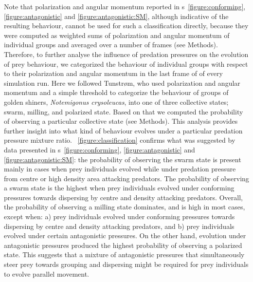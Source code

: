 Note that polarization and angular momentum reported in \figurename s~\ref{figure:conforming}, \ref{figure:antagonistic} and \ref{figure:antagonistic:SM}, although indicative of the resulting behaviour, cannot be used for such a classification directly, because they were computed as weighted sums of polarization and angular momentum of individual groups and averaged over a number of frames (see Methods). Therefore, to further analyse the influence of predation pressures on the evolution of prey behaviour, we categorized the behaviour of individual groups with respect to their polarization and angular momentum in the last frame of of every simulation run. Here we followed Tunstrøm\etal \cite{tunstrom2013collective}, who used polarization and angular momentum and a simple threshold to categorize the behaviour of groups of golden shiners, \emph{Notemigonus crysoleucas}, into one of three collective states; swarm, milling, and polarized state. Based on that we computed the probability of observing a particular collective state (see Methods). This analysis provides further insight into what kind of behaviour evolves under a particular predation pressure mixture ratio. \figurename~\ref{figure:classification} confirms what was suggested by data presented in \figurename s~\ref{figure:conforming}, \ref{figure:antagonistic} and \ref{figure:antagonistic:SM}: the probability of observing the swarm state is present mainly in cases when prey individuals evolved while under predation pressure from centre or high density area attacking predators. The probability of observing a swarm state is the highest when prey individuals evolved under conforming pressures towards dispersing by centre and density attacking predators. Overall, the probability of observing a milling state dominates, and is high in most cases, except when: a) prey individuals evolved under conforming pressures towards dispersing by centre and density attacking predators, and b) prey individuals evolved under certain antagonistic pressures. On the other hand, evolution under antagonistic pressures produced the highest probability of observing a polarized state. This suggests that a mixture of antagonistic pressures that simultaneously steer prey towards grouping and dispersing might be required for prey individuals to evolve parallel movement.

